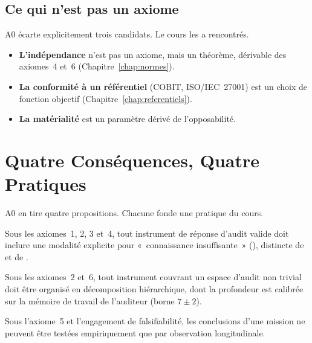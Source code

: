 \subsection{Ce qui n'est pas un axiome}

A0 écarte explicitement trois candidats. Le cours les a rencontrés.
\begin{itemize}
    \item \textbf{L'indépendance} n'est pas un axiome, mais un théorème,
          dérivable des axiomes~4 et~6 (Chapitre~\ref{chap:normes}).
    \item \textbf{La conformité à un référentiel} (COBIT, ISO/IEC~27001) est
          un choix de fonction objectif (Chapitre~\ref{chap:referentiels}).
    \item \textbf{La matérialité} est un paramètre dérivé de l'opposabilité.
\end{itemize}

\section{Quatre Conséquences, Quatre Pratiques}
\label{sec:c21-propositions}

A0 en tire quatre propositions. Chacune fonde une pratique du cours.

\begin{proposition}
Sous les axiomes~1, 2, 3 et~4, tout instrument de réponse d'audit valide
doit inclure une modalité explicite pour «~connaissance insuffisante~»
(\NEK{}), distincte de \OUI{} et de \NON{}.
\end{proposition}

\begin{proposition}
Sous les axiomes~2 et~6, tout instrument couvrant un espace d'audit non
trivial doit être organisé en décomposition hiérarchique, dont la
profondeur est calibrée sur la mémoire de travail de l'auditeur (borne
$7 \pm 2$).
\end{proposition}

\begin{proposition}
Sous l'axiome~5 et l'engagement de falsifiabilité, les conclusions d'une
mission ne peuvent être testées empiriquement que par observation
longitudinale.
\end{proposition}

